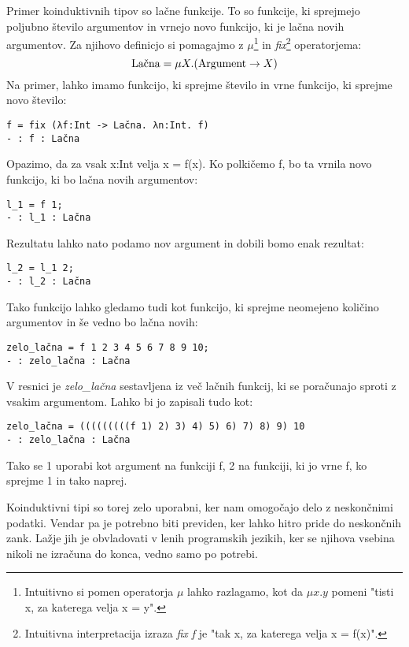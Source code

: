 \documentclass[12pt,a4paper,openany]{book}
\begin{document}
Primer koinduktivnih tipov so lačne funkcije. To so funkcije, ki sprejmejo poljubno število argumentov in vrnejo novo funkcijo, ki je lačna novih argumentov. Za njihovo definicjo 
si pomagajmo z \(\mu\)\footnote{Intuitivno si pomen operatorja \(\mu\) lahko razlagamo, kot da \(\mu x.y\) pomeni "tisti x, za katerega velja x = y".} in \emph{fix}\footnote{Intuitivna 
interpretacija izraza \emph{fix f} je "tak x, za katerega velja x = f(x)".} operatorjema:
\begin{equation}
    \text{Lačna} = \mu X. (\text{Argument} \rightarrow X) \notag
\end{equation}
Na primer, lahko imamo funkcijo, ki sprejme število in vrne funkcijo, ki sprejme novo število:
\begin{lstlisting}
f = fix (λf:Int -> Lačna. λn:Int. f)
- : f : Lačna
\end{lstlisting}
Opazimo, da za vsak x:Int velja x = f(x).
Ko polkičemo f, bo ta vrnila novo funkcijo, ki bo lačna novih argumentov:
\begin{lstlisting}
l_1 = f 1;
- : l_1 : Lačna
\end{lstlisting}
Rezultatu lahko nato podamo nov argument in dobili bomo enak rezultat:
\begin{lstlisting}
l_2 = l_1 2;
- : l_2 : Lačna  
\end{lstlisting}
Tako funkcijo lahko gledamo tudi kot funkcijo, ki sprejme neomejeno količino argumentov in še vedno bo lačna novih:
\begin{lstlisting}
zelo_lačna = f 1 2 3 4 5 6 7 8 9 10;
- : zelo_lačna : Lačna
\end{lstlisting}
V resnici je \emph{zelo\_lačna} sestavljena iz več lačnih funkcij, ki se poračunajo sproti z vsakim argumentom. Lahko bi jo zapisali tudo kot:
\begin{lstlisting}
zelo_lačna = (((((((((f 1) 2) 3) 4) 5) 6) 7) 8) 9) 10
- : zelo_lačna : Lačna
\end{lstlisting}
Tako se 1 uporabi kot argument na funkciji f, 2 na funkciji, ki jo vrne f, ko sprejme 1 in tako naprej.

Koinduktivni tipi so torej zelo uporabni, ker nam omogočajo delo z neskončnimi podatki. Vendar pa je potrebno biti previden, ker lahko hitro pride do neskončnih zank. 
Lažje jih je obvladovati v lenih programskih jezikih, ker se njihova vsebina nikoli ne izračuna do konca, vedno samo po potrebi.
\end{document}
